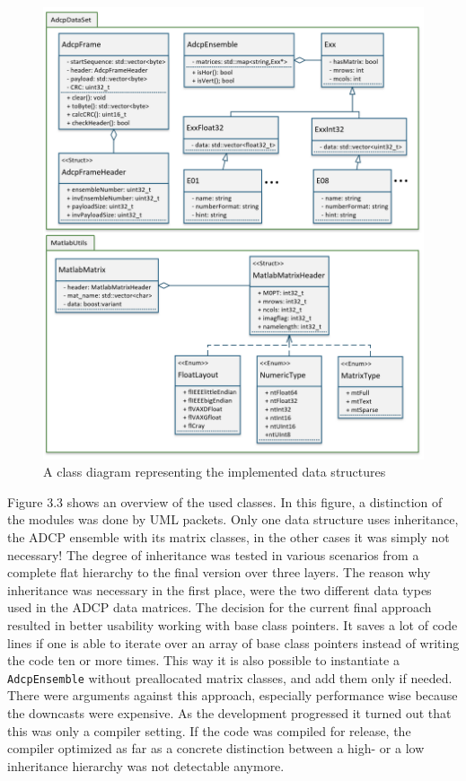 \begin{figure}[!ht]
\centering
      \includegraphics[width=1\textwidth]{data_structures}
        \caption{A class diagram representing the implemented data structures}
\end{figure}

Figure 3.3 shows an overview of the used classes. In this figure, a distinction of the modules was done by UML packets. Only one data structure uses inheritance, the ADCP ensemble with its matrix classes, in the other cases it was simply not necessary! The degree of inheritance was tested in various scenarios from a complete flat hierarchy to the final version over three layers. The reason why inheritance was necessary in the first place, were the two different data types used in the ADCP data matrices. The decision for the current final approach resulted in better usability working with base class pointers. It saves a lot of code lines if one is able to iterate over an array of base class pointers instead of writing the code ten or more times. This way it is also possible to instantiate a \texttt{AdcpEnsemble} without preallocated matrix classes, and add them only if needed. There were arguments against this approach, especially performance wise because the downcasts were expensive. As the development progressed it turned out that this was only a compiler setting. If the code was compiled for release, the compiler optimized as far as a concrete distinction between a high- or a low inheritance hierarchy was not detectable anymore.

